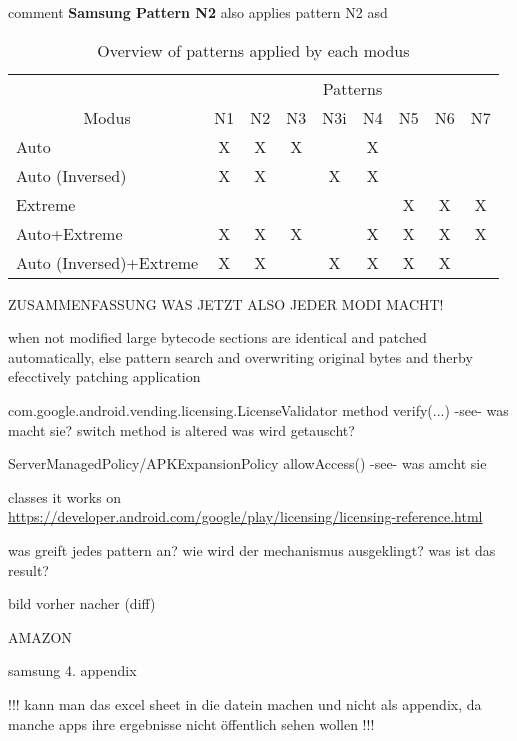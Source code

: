 comment
\newline
\newline
\textbf{Samsung Pattern N2}\newline
also applies pattern N2
\newline
asd
\begin{table}[h]
\centering
\begin{tabular}{l|cccccccc}
                           & \multicolumn{8}{c}{Patterns}           \\
\multicolumn{1}{c|}{Modus} & N1 & N2 & N3 & N3i & N4 & N5 & N6 & N7 \\ \hline
Auto                       & X  & X  & X  &     & X  &    &    &    \\
Auto (Inversed)            & X  & X  &    & X   & X  &    &    &    \\
Extreme                    &    &    &    &     &    & X  & X  & X  \\
Auto+Extreme               & X  & X  & X  &     & X  & X  & X  & X  \\
Auto (Inversed)+Extreme    & X  & X  &    & X   & X  & X  & X  &
\end{tabular}
\caption{Overview of patterns applied by each modus}
\label{table:patterns}
\end{table}

ZUSAMMENFASSUNG WAS JETZT ALSO JEDER MODI MACHT!



%
when  not modified large bytecode sections are identical and patched automatically, else pattern search and overwriting original bytes and therby efecctively patching application



com.google.android.vending.licensing.LicenseValidator
method verify(...) -see- was macht sie?
switch method is altered
was wird getauscht?


ServerManagedPolicy/APKExpansionPolicy
allowAccess() -see- was amcht sie



\cite{munteanLicense}
%

classes it works on
\url{https://developer.android.com/google/play/licensing/licensing-reference.html}

was greift jedes pattern an? wie wird der mechanismus ausgeklingt? was ist das result?

bild vorher nacher (diff)


AMAZON

samsung
\cite{samsungZirconia} 4. appendix



!!! kann man das excel sheet in die datein machen und nicht als appendix, da manche apps ihre ergebnisse nicht öffentlich sehen wollen !!!

